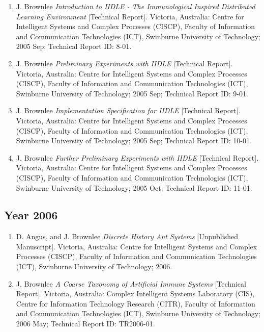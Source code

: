 \begin{enumerate}
	\item J. Brownlee \emph{Introduction to IIDLE - The Immunological Inspired Distributed Learning Environment} [Technical Report]. Victoria, Australia: Centre for Intelligent Systems and Complex Processes (CISCP), Faculty of Information and Communication Technologies (ICT), Swinburne University of Technology; 2005 Sep; Technical Report ID: 8-01.
	\item J. Brownlee \emph{Preliminary Experiments with IIDLE} [Technical Report]. Victoria, Australia: Centre for Intelligent Systems and Complex Processes (CISCP), Faculty of Information and Communication Technologies (ICT), Swinburne University of Technology; 2005 Sep; Technical Report ID: 9-01.
	\item J. Brownlee \emph{Implementation Specification for IIDLE} [Technical Report]. Victoria, Australia: Centre for Intelligent Systems and Complex Processes (CISCP), Faculty of Information and Communication Technologies (ICT), Swinburne University of Technology; 2005 Sep; Technical Report ID: 10-01.
	\item J. Brownlee \emph{Further Preliminary Experiments with IIDLE} [Technical Report]. Victoria, Australia: Centre for Intelligent Systems and Complex Processes (CISCP), Faculty of Information and Communication Technologies (ICT), Swinburne University of Technology; 2005 Oct; Technical Report ID: 11-01.
\end{enumerate}

%
%
\subsection{Year 2006}

\begin{enumerate}
	\small
	\item D. Angus, and J. Brownlee \emph{Discrete History Ant Systems} [Unpublished Manuscript]. Victoria, Australia: Centre for Intelligent Systems and Complex Processes (CISCP), Faculty of Information and Communication Technologies (ICT), Swinburne University of Technology; 2006.
	\item J. Brownlee \emph{A Coarse Taxonomy of Artificial Immune Systems} [Technical Report]. Victoria, Australia: Complex Intelligent Systems Laboratory (CIS), Centre for Information Technology Research (CITR), Faculty of Information and Communication Technologies (ICT), Swinburne University of Technology; 2006 May; Technical Report ID: TR2006-01.
\end{enumerate}


